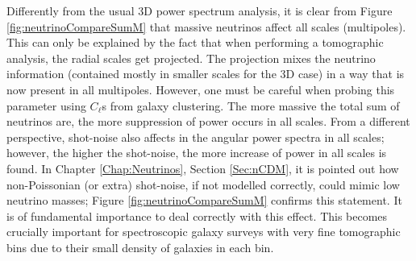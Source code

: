 \qquad Differently from the usual 3D power spectrum analysis, it is clear from Figure \ref{fig:neutrinoCompareSumM} that massive neutrinos affect all scales (multipoles). This can only be explained by the fact that when performing a tomographic analysis, the radial scales get projected. The projection mixes the neutrino information (contained mostly in smaller scales for the 3D case) in a way that is now present in all multipoles. However, one must be careful when probing this parameter using $C_{\ell}$s from galaxy clustering. The more massive the total sum of neutrinos are, the more suppression of power occurs in all scales. From a different perspective, shot-noise also affects in the angular power spectra in all scales; however, the higher the shot-noise, the more increase of power in all scales is found. In Chapter \ref{Chap:Neutrinos}, Section \ref{Sec:nCDM}, it is pointed out how non-Poissonian (or extra) shot-noise, if not modelled correctly, could mimic low neutrino masses; Figure \ref{fig:neutrinoCompareSumM} confirms this statement. It is of fundamental importance to deal correctly with this effect. This becomes crucially important for spectroscopic galaxy surveys with very fine tomographic bins due to their small density of galaxies in each bin.

